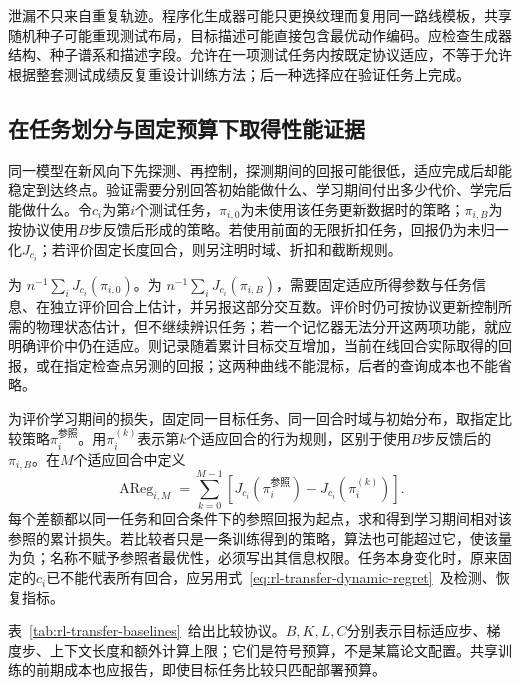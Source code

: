 泄漏不只来自重复轨迹。程序化生成器可能只更换纹理而复用同一路线模板，共享随机种子可能重现测试布局，目标描述可能直接包含最优动作编码。应检查生成器结构、种子谱系和描述字段。允许在一项测试任务内按既定协议适应，不等于允许根据整套测试成绩反复重设计训练方法；后一种选择应在验证任务上完成。

\subsection{在任务划分与固定预算下取得性能证据}
\label{sec:rl-transfer-evidence}

同一模型在新风向下先探测、再控制，探测期间的回报可能很低，适应完成后却能稳定到达终点。验证需要分别回答初始能做什么、学习期间付出多少代价、学完后能做什么。令$c_i$为第$i$个测试任务，$\pi_{i,0}$为未使用该任务更新数据时的策略；$\pi_{i,B}$为按协议使用$B$步反馈后形成的策略。若使用前面的无限折扣任务，回报仍为未归一化$J_{c_i}$；若评价固定长度回合，则另注明时域、折扣和截断规则。

为
$n^{-1}\sum_iJ_{c_i}(\pi_{i,0})$。为
$n^{-1}\sum_iJ_{c_i}(\pi_{i,B})$，需要固定适应所得参数与任务信息、在独立评价回合上估计，并另报这部分交互数。评价时仍可按协议更新控制所需的物理状态估计，但不继续辨识任务；若一个记忆器无法分开这两项功能，就应明确评价中仍在适应。则记录随着累计目标交互增加，当前在线回合实际取得的回报，或在指定检查点另测的回报；这两种曲线不能混标，后者的查询成本也不能省略。

为评价学习期间的损失，固定同一目标任务、同一回合时域与初始分布，取指定比较策略$\pi_i^{\text{参照}}$。用$\pi_i^{(k)}$表示第$k$个适应回合的行为规则，区别于使用$B$步反馈后的$\pi_{i,B}$。在$M$个适应回合中定义
\begin{equation}
 \operatorname{AReg}_{i,M}
 =\sum_{k=0}^{M-1}
 \left[J_{c_i}(\pi_i^{\text{参照}})
       -J_{c_i}(\pi_i^{(k)})\right].
 \label{eq:rl-transfer-adaptation-regret}
\end{equation}
每个差额都以同一任务和回合条件下的参照回报为起点，求和得到学习期间相对该参照的累计损失。若比较者只是一条训练得到的策略，算法也可能超过它，使该量为负；名称不赋予参照者最优性，必须写出其信息权限。任务本身变化时，原来固定的$c_i$已不能代表所有回合，应另用式~\eqref{eq:rl-transfer-dynamic-regret}~及检测、恢复指标。

表~\ref{tab:rl-transfer-baselines}~给出比较协议。$B,K,L,C$分别表示目标适应步、梯度步、上下文长度和额外计算上限；它们是符号预算，不是某篇论文配置。共享训练的前期成本也应报告，即使目标任务比较只匹配部署预算。


